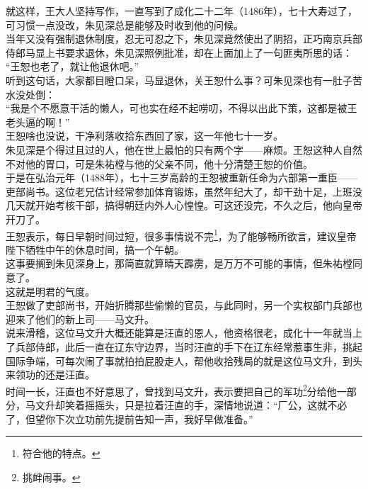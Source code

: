 \begin{multicols}{\theparacolNo}
就这样，王大人坚持写作，一直写到了成化二十二年（1486年），七十大寿过了，可习惯一点没改，朱见深总是能够及时收到他的问候。\\

当年又没有强制退休制度，忍无可忍之下，朱见深竟然使出了阴招，正巧南京兵部侍郎马显上书要求退休，朱见深照例批准，却在上面加上了一句匪夷所思的话：\\

“王恕也老了，就让他退休吧。”\\

听到这句话，大家都目瞪口呆，马显退休，关王恕什么事？可朱见深也有一肚子苦水没处倒：\\

“我是个不愿意干活的懒人，可也实在经不起唠叨，不得以出此下策，这都是被王老头逼的啊！”\\

王恕啥也没说，干净利落收拾东西回了家，这一年他七十一岁。\\

朱见深是个得过且过的人，他在世上最怕的只有两个字——麻烦。王恕这种人自然不对他的胃口，可是朱祐樘与他的父亲不同，他十分清楚王恕的价值。\\

于是在弘治元年（1488年），七十三岁高龄的王恕被重新任命为六部第一重臣——吏部尚书。这位老兄估计经常参加体育锻炼，虽然年纪大了，却干劲十足，上班没几天就开始考核干部，搞得朝廷内外人心惶惶。可这还没完，不久之后，他向皇帝开刀了。\\

王恕表示，每日早朝时间过短，很多事情说不完\footnote{符合他的特点。}，为了能够畅所欲言，建议皇帝陛下牺牲中午的休息时间，搞一个午朝。\\

这事要搁到朱见深身上，那简直就算晴天霹雳，是万万不可能的事情，但朱祐樘同意了。\\

这就是明君的气度。\\

王恕做了吏部尚书，开始折腾那些偷懒的官员，与此同时，另一个实权部门兵部也迎来了他们的新上司——马文升。\\

说来滑稽，这位马文升大概还能算是汪直的恩人，他资格很老，成化十一年就当上了兵部侍郎，此后一直在辽东守边界，当时汪直的手下在辽东经常惹事生非，挑起国际争端，可每次闹了事就拍拍屁股走人，帮他收拾残局的就是这位马文升，到头来领功的还是汪直。\\

时间一长，汪直也不好意思了，曾找到马文升，表示要把自己的军功\footnote{挑衅闹事。}分给他一部分，马文升却笑着摇摇头，只是拉着汪直的手，深情地说道：“厂公，这就不必了，但望你下次立功前先提前告知一声，我好早做准备。”\\


\end{multicols}
